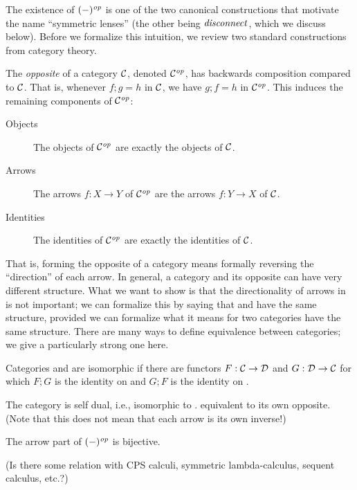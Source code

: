 \begin{defn}[$R$-similarity]
\begin{theorem}
\begin{lemma}
\ifdissertation
The existence of $(-)^\mathit{op}$ is one of the two canonical constructions that
motivate the name ``symmetric lenses'' (the other being $\mathit{disconnect}$, which
we discuss below). Before we formalize this intuition, we review two
standard constructions from category theory.
\begin{definition}
    The \emph{opposite} of a category $\mathcal C$, denoted $\mathcal C^\mathit{op}$, has
    backwards composition compared to $\mathcal C$. That is, whenever $f;g=h$ in
    $\mathcal C$, we have $g;f=h$ in $\mathcal C^\mathit{op}$. This induces the remaining
    components of $\mathcal C^\mathit{op}$:
    \begin{description}
        \item[Objects] The objects of $\mathcal C^\mathit{op}$ are exactly the objects of
            $\mathcal C$.
        \item[Arrows] The arrows $f : X \to Y$ of $\mathcal C^\mathit{op}$ are the arrows
            $f : Y \to X$ of $\mathcal C$.
        \item[Identities] The identities of $\mathcal C^\mathit{op}$ are exactly the
            identities of $\mathcal C$.
    \end{description}
\end{definition}
That is, forming the opposite of a category means formally reversing the
``direction'' of each arrow. In general, a category and its opposite can
have very different structure. What we want to show is that the
directionality of arrows in \LENS is not important; we can formalize this by
saying that \LENS and \LENSop have the same structure, provided we can
formalize what it means for two categories have the same structure. There
are many ways to define equivalence between categories; we give a
particularly strong one here.
\begin{definition}
    Categories \catC and \catD are isomorphic if there are functors $F :
    \mathcal C \to \mathcal D$ and $G : \mathcal D \to \mathcal C$ for which $F;G$ is the
    identity on \catC and $G;F$ is the identity on \catD.
\end{definition}
\fi%

\begin{corollary}\label{self_duality}
The category \LENS is self dual, i.e., \ifdissertation isomorphic to
\LENSop. \else equivalent to its own opposite. \fi (Note that this does not
mean that each arrow is its own inverse!)
\end{corollary}
\begin{pf}
The arrow part of $(-)^\mathit{op}$ is bijective.
\end{pf}
\iflater\finish(Is there  some relation with CPS calculi, symmetric
lambda-calculus, sequent calculus, etc.?)  \fi


\end{lemma}
\end{theorem}
\end{defn}
